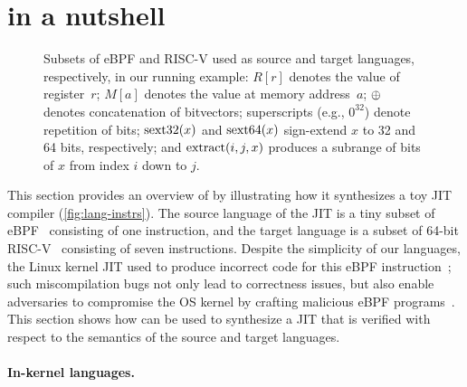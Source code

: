 \section{\jitsynth in a nutshell}%
\label{s:overview}

\begin{figure}[h]
  \centering
  \resizebox{\linewidth}{!}{
    
  }
  \vspace{-.5em}
  \caption{Subsets of eBPF and RISC-V
used as source and target languages, respectively,
in our running example:
$R[r]$ denotes the value of register~$r$;
$M[a]$ denotes the value at memory address~$a$;
$\oplus$ denotes concatenation of bitvectors;
superscripts (e.g., $0^{32}$) denote repetition of bits;
$\operatorname{sext32}(x)$ and $\operatorname{sext64}(x)$ sign-extend $x$ to 32 and 64 bits, respectively;
and $\operatorname{extract}(i, j, x)$ produces a subrange of bits of $x$ from index $i$ down to $j$.}
\label{fig:lang-instrs}
\end{figure}

This section provides an overview of \jitsynth by illustrating how it
synthesizes a toy JIT compiler (\autoref{fig:lang-instrs}). The source language
of the JIT is a tiny subset of eBPF~\cite{fleming:ebpf} consisting of one
instruction, and the target language is a subset of 64-bit
RISC-V~\cite{riscv:isa} consisting of seven instructions. Despite the simplicity
of our languages, the Linux kernel JIT used to produce incorrect code for this
eBPF instruction~\cite{nelson:bpf-riscv-add32-bug}; such miscompilation bugs not
only lead to correctness issues, but also enable adversaries to compromise the
OS kernel by crafting malicious eBPF programs~\cite{wang:jitk}. This section
shows how \jitsynth can be used to synthesize a JIT that is verified with
respect to the semantics of the source and target languages.\tighten

\paragraph{In-kernel languages.} 

